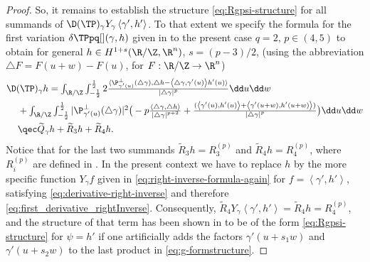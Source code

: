 \begin{proof}
So, it remains to establish the structure \cref{eq:Rgpsi-structure} for all summands of $ \D(\TP)_{\gamma}Y_\gamma \left\langle \gamma',h' \right\rangle  $. To that extent we specify the formula for the first variation $ \delta \TPpq[](\gamma,h) $ given in \cite[Theorem 1.4]{blatt-reiter_2015a} to the present case $ q=2,\,p\in(4,5) $ to obtain for general $ h\in H^{1+s}(\R/\Z,\R^n) $, $ s=(p-3)/2 $, (using the abbreviation $ \triangle F=F(u+w)-F(u) $, for $ F:\R/\Z\to\R^n $)
\begin{equation}
\begin{aligned}
    \label{eq:DTP_formula}
        &\textstyle\D(\TP)_{\gamma}h=\int_{\R/\Z}\int_{-\frac{1}{2}}^{\frac{1}{2}}
		2\frac{\langle \P^\perp_{\gamma'(u)}(\triangle\gamma),\triangle h -\left\langle \triangle \gamma,\gamma'(u) \right\rangle h'(u) \rangle }{\left|\triangle \gamma \right|^p}\dd u \dd w\\
		&\textstyle\hspace{12pt}+\int_{\R/\Z}\int_{-\frac{1}{2}}^{\frac{1}{2}}|\P^\perp_{\gamma'(u)}(\triangle \gamma) |^2\big(-p\frac{\left\langle \triangle \gamma,\triangle h \right\rangle}{\left|\triangle \gamma \right|^{p+2}}
		+\frac{(\left\langle \gamma'(u),h'(u) \right\rangle+\left\langle \gamma'(u+w),h'(u+w) \right\rangle  )}{\left|\triangle \gamma \right|^{p}}\big)\dd u \dd w\\
        &\textstyle\hspace{12pt}\qec\widetilde{Q}_{\gamma}h+\widetilde{R}_3h+\widetilde{R}_4h.
\end{aligned}
\end{equation}
Notice that for the last two summands $ \widetilde{R}_3h=R_3^{(p)} $ and $ \widetilde{R}_4h=R_4^{(p)} $, where $ R_i^{(p)} $ are defined in \cite[(4.3)]{blatt-reiter_2015a}. In the present context we have to replace $ h $ by the more specific function $ Y_\gamma f $ given in \cref{eq:right-inverse-formula-again} for $ f=\left\langle \gamma',h' \right\rangle  $, satisfying \cref{eq:derivative-right-inverse}
and therefore \cref{eq:first_derivative_rightInverse}. Consequently, $ \tilde{R}_{4}Y_{\gamma}\left\langle \gamma',h' \right\rangle=\tilde{R}_{4}h =R_4^{(p)} $, and the structure of that term has been shown in \cite[Lemma 4.2]{blatt-reiter_2015a} to be of the form \cref{eq:Rgpsi-structure} for $ \psi=h' $ if one artificially adds the factors $ \gamma'(u+s_1w) $ and $ \gamma'(u+s_2w) $ to the last product in \cref{eq:g-formstructure}. 


\end{proof}
